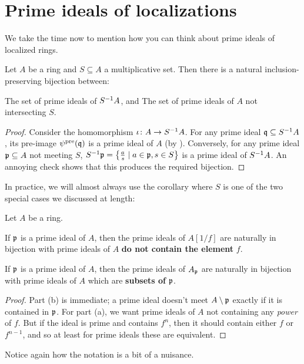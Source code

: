 \section{Prime ideals of localizations}
We take the time now to mention how you can
think about prime ideals of localized rings.
\begin{proposition}
	Let $A$ be a ring and $S \subseteq A$ a multiplicative set.
	Then there is a natural inclusion-preserving bijection between:
	\begin{itemize}
		\ii The set of prime ideals of $S^{-1} A$, and
		\ii The set of prime ideals of $A$ not intersecting $S$.
	\end{itemize}
\end{proposition}
\begin{proof}
	Consider the homomorphism $\iota \colon A \to S^{-1} A$.
	For any prime ideal $\mathfrak q \subseteq S^{-1} A$,
	its pre-image $\psi^{\text{pre}}(\mathfrak q)$ is a prime ideal of $A$
	(by ).
	Conversely, for any prime ideal $\mathfrak p \subseteq A$
	not meeting $S$,
	$S^{-1} \mathfrak p = \left\{ \frac{a}{s} \mid a \in \mathfrak p, s \in S \right\}$
	is a prime ideal of $S^{-1} A$.
	An annoying check shows that this produces the required bijection.
\end{proof}
In practice, we will almost always use the corollary
where $S$ is one of the two special cases we discussed at length:
\begin{corollary}
	Let $A$ be a ring.
	\begin{enumerate}[(a)]
		\ii If $\mathfrak p$ is a prime ideal of $A$,
		then the prime ideals of $A[1/f]$ are naturally
		in bijection with prime ideals of $A$
		\textbf{do not contain the element} $f$.

		\ii If $\mathfrak p$ is a prime ideal of $A$,
		then the prime ideals of $A_\mathfrak p$ are naturally
		in bijection with prime ideals of $A$
		which are \textbf{subsets of} $\mathfrak p$.
	\end{enumerate}
\end{corollary}
\begin{proof}
	Part (b) is immediate; a prime ideal doesn't meet $A \setminus \mathfrak p$
	exactly if it is contained in $\mathfrak p$.
	For part (a), we want prime ideals of $A$ not containing
	any \emph{power} of $f$.
	But if the ideal is prime and contains $f^n$,
	then it should contain either $f$ or $f^{n-1}$,
	and so at least for prime ideals these are equivalent.
\end{proof}
Notice again how the notation is a bit of a nuisance.
